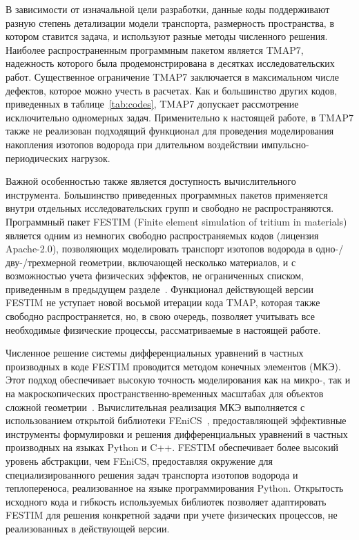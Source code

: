 В зависимости от изначальной цели разработки, данные коды поддерживают разную степень детализации модели транспорта, размерность пространства, в котором ставится задача, и используют разные методы численного решения. Наиболее распространенным программным пакетом является TMAP7, надежность которого была продемонстрирована в десятках исследовательских работ. Существенное ограничение TMAP7 заключается в максимальном числе дефектов, которое можно учесть в расчетах. Как и большинство других кодов, приведенных в таблице~\cref{tab:codes}, TMAP7 допускает рассмотрение исключительно одномерных задач. Применительно к настоящей работе, в TMAP7 также не реализован подходящий функционал для проведения моделирования накопления изотопов водорода при длительном воздействии импульсно-периодических нагрузок.

Важной особенностью также является доступность вычислительного инструмента. Большинство приведенных программных пакетов применяется внутри отдельных исследовательских групп и свободно не распространяются. Программный пакет FESTIM (Finite element simulation of tritium in materials) является одним из немногих свободно распространяемых кодов (лицензия Apache-2.0), позволяющих моделировать транспорт изотопов водорода в одно-/дву-/трехмерной геометрии, включающей несколько материалов, и с возможностью учета физических эффектов, не ограниченных списком, приведенным в предыдущем разделе~\cite{Kulagin2024}. Функционал действующей версии FESTIM не уступает новой восьмой итерации кода TMAP, которая также свободно распространяется, но, в свою очередь, позволяет учитывать все необходимые физические процессы, рассматриваемые в настоящей работе.

Численное решение системы дифференциальных уравнений в частных производных в коде FESTIM проводится методом конечных элементов (МКЭ). Этот подход обеспечивает высокую точность моделирования как на микро-, так и на макроскопических пространственно-временных масштабах для объектов сложной геометрии~\cite{Nordlund2014}. Вычислительная реализация МКЭ выполняется с использованием открытой библиотеки FEniCS~\cite{FEniCS}, предоставляющей эффективные инструменты формулировки и решения дифференциальных уравнений в частных производных на языках Python и C++. FESTIM обеспечивает более высокий уровень абстракции, чем FEniCS, предоставляя окружение для специализированного решения задач транспорта изотопов водорода и теплопереноса, реализованное на языке программирования Python. Открытость исходного кода и гибкость используемых библиотек позволяет адаптировать FESTIM для решения конкретной задачи при учете физических процессов, не реализованных в действующей версии.

